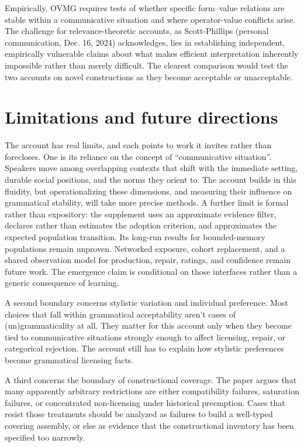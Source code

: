 \documentclass[12pt,letterpaper]{article}
\begin{document}
Empirically, OVMG requires tests of whether specific form--value relations are stable within a communicative situation and where operator-value conflicts arise. The challenge for relevance-theoretic accounts, as Scott-Phillips (personal communication, Dec. 16, 2024) acknowledges, lies in establishing independent, empirically vulnerable claims about what makes efficient interpretation inherently impossible rather than merely difficult. The clearest comparison would test the two accounts on novel constructions as they become acceptable or unacceptable.

\section{Limitations and future directions}\label{sec:limitations}

The account has real limits, and each points to work it invites rather than
forecloses. One is its reliance on the concept of \enquote{communicative
situation}. Speakers move among overlapping contexts that shift with the
immediate setting, durable social positions, and the norms they orient to. The
account builds in this fluidity, but operationalizing these dimensions, and
measuring their influence on grammatical stability, will take more precise
methods. A further limit is formal rather than expository: the supplement uses
an approximate evidence filter, declares rather than estimates the adoption
criterion, and approximates the expected population transition. Its long-run
results for bounded-memory populations remain unproven. Networked exposure,
cohort replacement, and a shared observation model for production, repair,
ratings, and confidence remain future work. The emergence claim is conditional
on those interfaces rather than a generic consequence of learning.

A second boundary concerns stylistic variation and individual preference. Most choices that fall within grammatical acceptability aren't cases of (un)grammaticality at all. They matter for this account only when they become tied to communicative situations strongly enough to affect licensing, repair, or categorical rejection. The account still has to explain how stylistic preferences become grammatical licensing facts.

A third concerns the boundary of constructional coverage. The paper argues that many apparently arbitrary restrictions are either compatibility failures, saturation failures, or concentrated non-licensing under historical preemption. Cases that resist those treatments should be analyzed as failures to build a well-typed covering assembly, or else as evidence that the constructional inventory has been specified too narrowly.
\end{document}
